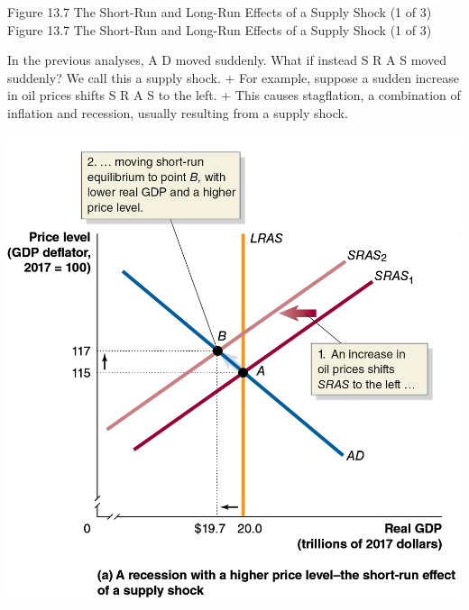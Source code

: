 \documentclass[
  12pt,
  ignorenonframetext,
]{beamer}
\begin{document}
\begin{frame}{Figure 13.7 The Short-Run and Long-Run Effects of a Supply
Shock (1 of 3)}
\protect\hypertarget{figure-13.7-the-short-run-and-long-run-effects-of-a-supply-shock-1-of-3}{}
Figure 13.7 The Short-Run and Long-Run Effects of a Supply Shock (1 of
3)

In the previous analyses, A D moved suddenly. What if instead S R A S
moved suddenly? We call this a supply shock. + For example, suppose a
sudden increase in oil prices shifts S R A S to the left. + This causes
stagflation, a combination of inflation and recession, usually resulting
from a supply shock.

\includegraphics[width=\textwidth,height=0.99\textheight]{imgs3/img_slide37a.png}
\end{frame}
\end{document}
